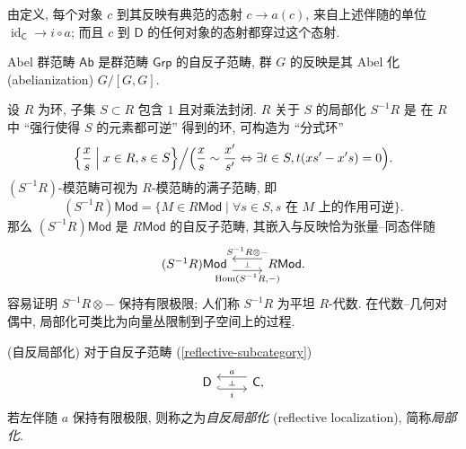 由定义, 每个对象 $c$ 到其反映有典范的态射 $c \to a(c)$, 来自上述伴随的单位 $\operatorname{id}_{\mathsf C}\to i\circ a$;
而且 $c$ 到 $\mathsf D$ 的任何对象的态射都穿过这个态射.

\begin{example}
	{}
	Abel 群范畴 $\mathsf {Ab}$ 是群范畴 $\mathsf {Grp}$ 的自反子范畴, 群 $G$ 的反映是其 Abel 化 (abelianization) $G/[G,G]$.
\end{example}

\begin{example}
	{}
	设 $R$ 为环, 子集 $S\subset R$ 包含 $1$ 且对乘法封闭. $R$ 关于 $S$ 的局部化 $S^{-1}R$ 是
	在 $R$ 中 ``强行使得 $S$ 的元素都可逆'' 得到的环,
	可构造为 ``分式环'' $$
	\Big\{\frac{x}{s} \Bigm| x\in R, s\in S\Big\}\Big/
	\Big(
	\frac{x}{s}\sim\frac{x'}{s'}\Leftrightarrow\exists
	t\in S, t(xs'-x's)=0
	\Big).$$
	$(S^{-1}R)$-模范畴可视为 $R$-模范畴的满子范畴,
	即
	\[
	(S^{-1}R)\mathsf {Mod}=\{ M\in R\mathsf {Mod} \mid \forall s\in S,
	\text{$s$ 在 $M$ 上的作用可逆} \}.
	\]
	那么 $(S^{-1}R)\mathsf {Mod}$ 是 $R\mathsf {Mod}$ 的自反子范畴,
	其嵌入与反映恰为张量--同态伴随
	\[\begin{tikzcd}[ampersand replacement=\&]
		{(S^{-1}R)\mathsf {Mod}} \& {R\mathsf {Mod}.}
		\arrow[""{name=0, anchor=center, inner sep=0}, "{\operatorname{Hom}(S^{-1}R,-)}"', shift right=2, from=1-1, to=1-2]
		\arrow[""{name=1, anchor=center, inner sep=0}, "{S^{-1}R\otimes -}"', shift right=2, from=1-2, to=1-1]
		\arrow["\dashv"{anchor=center, rotate=-90}, draw=none, from=1, to=0]
	\end{tikzcd}\]
	容易证明 $S^{-1}R\otimes -$ 保持有限极限; 人们称 $S^{-1}R$ 为平坦 $R$-代数.
	在代数--几何对偶中, 局部化可类比为向量丛限制到子空间上的过程.
\end{example}

\begin{definition}
	[label={reflective-localization}]
	{(自反局部化)}
	对于自反子范畴 (\ref{reflective-subcategory}) $$
	\begin{tikzcd}[ampersand replacement=\&]
		{\mathsf D} \& {\mathsf C,}
		\arrow[""{name=0, anchor=center, inner sep=0}, "i"', shift right=2, hook, from=1-1, to=1-2]
		\arrow[""{name=1, anchor=center, inner sep=0}, "a"', shift right=2, from=1-2, to=1-1]
		\arrow["\dashv"{anchor=center, rotate=-90}, draw=none, from=1, to=0]
	\end{tikzcd}
	$$
	若左伴随 $a$ 保持有限极限, 则称之为\emph{自反局部化} (reflective localization), 简称\emph{局部化}.
\end{definition}


